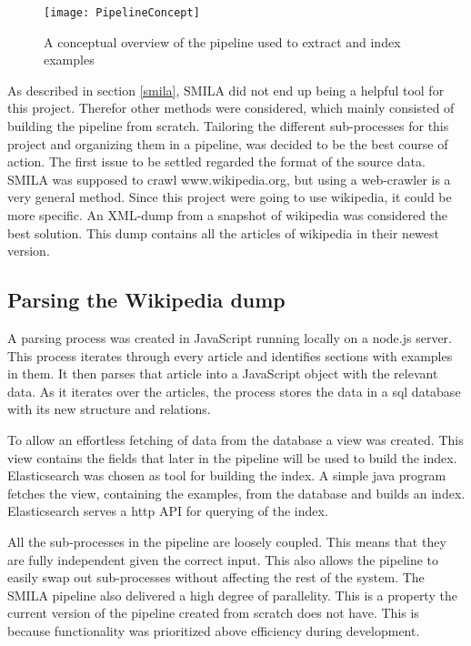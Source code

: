 
\begin{figure}[h]
\caption{A conceptual overview of the pipeline used to extract and index examples}
\texttt{[image: PipelineConcept]}
\end{figure}



As described in section \ref{smila}, SMILA did not end up being a helpful tool for this project. Therefor other methods were considered, which mainly consisted of building the pipeline from scratch. Tailoring the different sub-processes for this project and organizing them in a pipeline, was decided to be the best course of action. The first issue to be settled regarded the format of the source data. SMILA was supposed to crawl www.wikipedia.org, but using a web-crawler is a very general method. Since this project were going to use wikipedia, it could be more specific. An XML-dump from a snapshot of wikipedia was considered the best solution. This dump contains all the articles of wikipedia in their newest version.

\subsection{Parsing the Wikipedia dump}
A parsing process was created in JavaScript running locally on a node.js server. This process iterates through every article and identifies sections with examples in them. It then parses that article into a JavaScript object with the relevant data. As it iterates over the articles, the process stores the data in a sql database with its new structure and relations. 

To allow an effortless fetching of data from the database a view was created. This view contains the fields that later in the pipeline will be used to build the index. Elasticsearch was chosen as tool for building the index. A simple java program fetches the view, containing the examples, from the database and builds an index. Elasticsearch serves a http API for querying of the index.

All the sub-processes in the pipeline are loosely coupled. This means that they are fully independent given the correct input. This also allows the pipeline to easily swap out sub-processes without affecting the rest of the system. The SMILA pipeline also delivered a high degree of parallelity. This is a property the current version of the pipeline created from scratch does not have. This is because functionality was prioritized above efficiency during development. 



